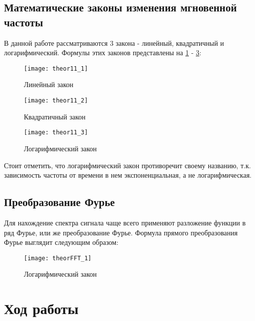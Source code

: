 \subsection{Математические законы изменения мгновенной частоты}
В данной работе рассматриваются 3 закона - линейный, квадратичный и логарифмический. Формулы этих законов представлены на \ref{pic:theor11_1} - \ref{pic:theor11_3}:
\begin{figure}[H]
	\begin{center}
		\texttt{[image: theor11\_1]}
		\caption{Линейный закон} 
		\label{pic:theor11_1} %
	\end{center}
\end{figure}
\begin{figure}[H]
	\begin{center}
		\texttt{[image: theor11\_2]}
		\caption{Квадратичный закон} 
		\label{pic:theor11_2} %
	\end{center}
\end{figure}
\begin{figure}[H]
	\begin{center}
		\texttt{[image: theor11\_3]}
		\caption{Логарифмический закон} 
		\label{pic:theor11_3} %
	\end{center}
\end{figure}
Стоит отметить, что логарифмический закон противоречит своему названию, т.к. зависимость частоты от времени в нем экспоненциальная, а не логарифмическая.

\subsection{Преобразование Фурье}
Для нахождение спектра сигнала чаще всего применяют разложение функции в ряд Фурье, или же преобразование Фурье.
Формула прямого преобразования Фурье выглядит следующим образом:
\begin{figure}[H]
	\begin{center}
		\texttt{[image: theorFFT\_1]}
		\caption{Логарифмический закон} 
		\label{pic:theorFFT_1} %
	\end{center}
\end{figure}



\section{Ход работы}

